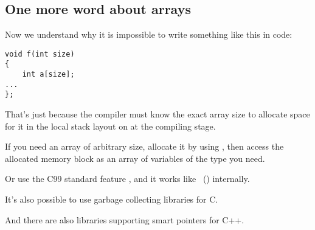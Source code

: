 \subsection{One more word about arrays}


Now we understand why it is impossible to write something like this in \CCpp code:

\begin{lstlisting}[style=customc]
void f(int size)
{
    int a[size];
...
};
\end{lstlisting}


That's just because the compiler must know the exact array size to allocate space for 
it in the local stack layout on at the compiling stage.


If you need an array of arbitrary size, allocate it by using , then access the allocated memory block
as an array of variables of the type you need.


Or use the C99 standard feature ,
and it works like ~() internally.


It's also possible to use garbage collecting libraries for C.

And there are also libraries supporting smart pointers for C++.


